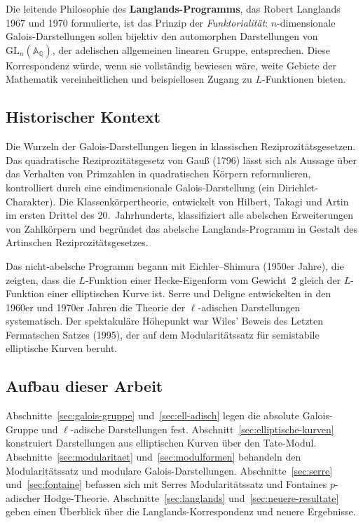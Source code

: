 \documentclass[a4paper,12pt]{amsart}
\theoremstyle{definition}
\theoremstyle{remark}
\newcommand{\Q}{\mathbb{Q}}
\newcommand{\GL}{\mathrm{GL}}
\begin{document}
Die leitende Philosophie des \textbf{Langlands-Programms}, das Robert Langlands 1967
und 1970 formulierte, ist das Prinzip der \emph{Funktorialität}: $n$-dimensionale
Galois-Darstellungen sollen bijektiv den automorphen Darstellungen von
$\GL_n(\mathbb{A}_\Q)$, der adelischen allgemeinen linearen Gruppe, entsprechen.
Diese Korrespondenz würde, wenn sie vollständig bewiesen wäre, weite Gebiete der
Mathematik vereinheitlichen und beispiellosen Zugang zu $L$-Funktionen bieten.

\subsection*{Historischer Kontext}

Die Wurzeln der Galois-Darstellungen liegen in klassischen Reziprozitätsgesetzen.
Das quadratische Reziprozitätsgesetz von Gauß (1796) lässt sich als Aussage über das
Verhalten von Primzahlen in quadratischen Körpern reformulieren, kontrolliert durch
eine eindimensionale Galois-Darstellung (ein Dirichlet-Charakter). Die Klassenkörpertheorie,
entwickelt von Hilbert, Takagi und Artin im ersten Drittel des 20.\ Jahrhunderts,
klassifiziert alle abelschen Erweiterungen von Zahlkörpern und begründet das abelsche
Langlands-Programm in Gestalt des Artinschen Reziprozitätsgesetzes.

Das nicht-abelsche Programm begann mit Eichler--Shimura (1950er Jahre), die zeigten,
dass die $L$-Funktion einer Hecke-Eigenform vom Gewicht~2 gleich der $L$-Funktion
einer elliptischen Kurve ist. Serre und Deligne entwickelten in den 1960er und 1970er
Jahren die Theorie der $\ell$-adischen Darstellungen systematisch. Der spektakuläre
Höhepunkt war Wiles' Beweis des Letzten Fermatschen Satzes (1995), der auf dem
Modularitätssatz für semistabile elliptische Kurven beruht.

\subsection*{Aufbau dieser Arbeit}

Abschnitte~\ref{sec:galois-gruppe} und~\ref{sec:ell-adisch} legen die absolute
Galois-Gruppe und $\ell$-adische Darstellungen fest. Abschnitt~\ref{sec:elliptische-kurven}
konstruiert Darstellungen aus elliptischen Kurven über den Tate-Modul.
Abschnitte~\ref{sec:modularitaet} und~\ref{sec:modulformen} behandeln den Modularitätssatz
und modulare Galois-Darstellungen. Abschnitte~\ref{sec:serre} und~\ref{sec:fontaine}
befassen sich mit Serres Modularitätssatz und Fontaines $p$-adischer Hodge-Theorie.
Abschnitte~\ref{sec:langlands} und~\ref{sec:neuere-resultate} geben einen Überblick
über die Langlands-Korrespondenz und neuere Ergebnisse.
\end{document}
